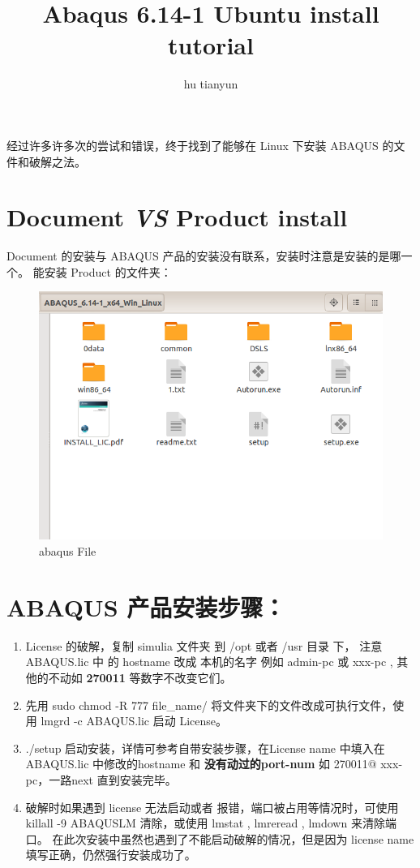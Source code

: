 \documentclass{article}
\begin{document}
\title{Abaqus 6.14-1 Ubuntu install tutorial}
\author{hu tianyun}
\maketitle
经过许多许多次的尝试和错误，终于找到了能够在 Linux 下安装 ABAQUS 的文件和破解之法。
\section{Document \textit{VS} Product install} %
\label{sec:document_vs_product_install}
	Document 的安装与 ABAQUS 产品的安装没有联系，安装时注意是安装的是哪一个。
	能安装 Product 的文件夹：

	\begin{figure}[!htbp]
	\centering
 		\includegraphics[width = .8\textwidth]{abaqus_install_ubuntu.png}
		\caption{abaqus  File}
		\label{abaqus_install_ubuntu}
	\end{figure}

	
\section{ABAQUS 产品安装步骤：} %
\label{sec:abaqus_installstep_}

	\begin{enumerate}
	\item License 的破解，复制 simulia 文件夹 到 /opt 或者 /usr 目录 下， 注意 ABAQUS.lic 中 的 hostname 改成 本机的名字 例如 admin-pc 或 xxx-pc , 其他的不动如 \textbf{270011} 等数字不改变它们。
	\item 先用  sudo chmod -R 777 file\_name/ 将文件夹下的文件改成可执行文件，使用 lmgrd -c ABAQUS.lic 启动 License。
	\item ./setup 启动安装，详情可参考自带安装步骤，在License name 中填入在 ABAQUS.lic 中修改的hostname 和  \textbf{没有动过的port-num} 如  270011@ xxx-pc，一路next 直到安装完毕。
	\item 破解时如果遇到 license 无法启动或者 报错，端口被占用等情况时，可使用 
	killall -9 ABAQUSLM 清除，或使用  lmstat , lmreread , lmdown 来清除端口。
	在此次安装中虽然也遇到了不能启动破解的情况，但是因为 license name 填写正确，仍然强行安装成功了。	
	\end{enumerate}
\end{document}
